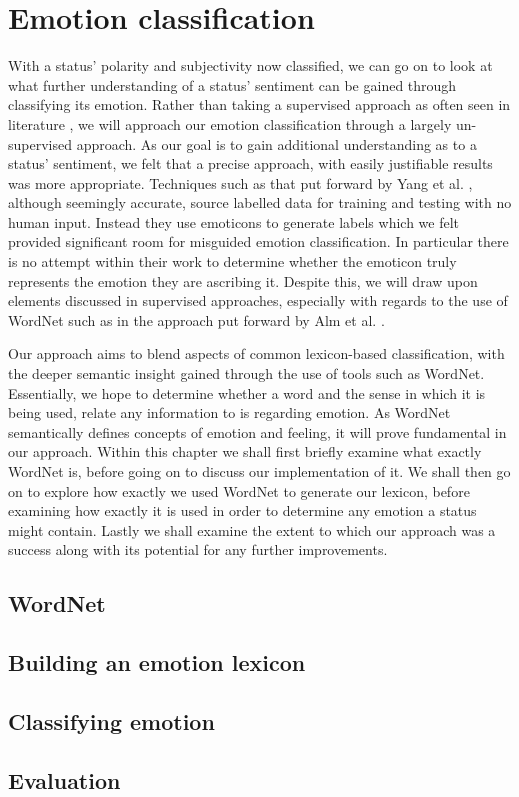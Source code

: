 \chapter{Emotion classification}
\label{emotion}

With a status' polarity and subjectivity now classified, we can go on to look at what further understanding of a status' sentiment can be gained through classifying its emotion. Rather than taking a supervised approach as often seen in literature \cite{Alm:2005vc}, we will approach our emotion classification through a largely un-supervised approach. As our goal is to gain additional understanding as to a status' sentiment, we felt that a precise approach, with easily justifiable results was more appropriate. Techniques such as that put forward by Yang et al. \cite{Yang:2007wx}, although seemingly accurate, source labelled data for training and testing with no human input. Instead they use emoticons to generate labels which we felt provided significant room for misguided emotion classification. In particular there is no attempt within their work to determine whether the emoticon truly represents the emotion they are ascribing it. Despite this, we will draw upon elements discussed in supervised approaches, especially with regards to the use of WordNet such as in the approach put forward by Alm et al. \cite{Alm:2005vc}. 


Our approach aims to blend aspects of common lexicon-based classification, with the deeper semantic insight gained through the use of tools such as WordNet. Essentially, we hope to determine whether a word and the sense in which it is being used, relate any information to is regarding emotion. As WordNet semantically defines concepts of emotion and feeling, it will prove fundamental in our approach. Within this chapter we shall first briefly examine what exactly WordNet is, before going on to discuss our implementation of it. We shall then go on to explore how exactly we used WordNet to generate our lexicon, before examining how exactly it is used in order to determine any emotion a status might contain. Lastly we shall examine the extent to which our approach was a success along with its potential for any further improvements.

\section{WordNet}
\label{emotion:wordnet}


\section{Building an emotion lexicon}

\section{Classifying emotion}

\section{Evaluation}
